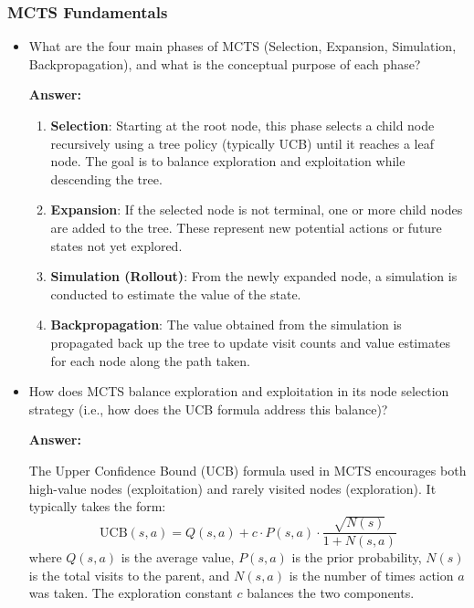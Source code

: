 \subsubsection{MCTS Fundamentals}
\begin{itemize}
    \item What are the four main phases of MCTS (Selection, Expansion, Simulation, Backpropagation), and what is the conceptual purpose of each phase?

    \textbf{Answer:}

    \begin{enumerate} 
    \item \textbf{Selection}: Starting at the root node, this phase selects a child node recursively using a tree policy (typically UCB) until it reaches a leaf node. The goal is to balance exploration and exploitation while descending the tree. 
    \item \textbf{Expansion}: If the selected node is not terminal, one or more child nodes are added to the tree. These represent new potential actions or future states not yet explored. 
    \item \textbf{Simulation (Rollout)}: From the newly expanded node, a simulation is conducted to estimate the value of the state.
    \item \textbf{Backpropagation}: The value obtained from the simulation is propagated back up the tree to update visit counts and value estimates for each node along the path taken. 
    \end{enumerate}
    
    \item How does MCTS balance exploration and exploitation in its node selection strategy (i.e., how does the UCB formula address this balance)?

    \textbf{Answer:}

    
    The Upper Confidence Bound (UCB) formula used in MCTS encourages both high-value nodes (exploitation) and rarely visited nodes (exploration). It typically takes the form:
    \[
    \text{UCB}(s, a) = Q(s, a) + c \cdot P(s, a) \cdot \frac{\sqrt{N(s)}}{1 + N(s, a)}
    \]
    where $Q(s, a)$ is the average value, $P(s, a)$ is the prior probability, $N(s)$ is the total visits to the parent, and $N(s, a)$ is the number of times action $a$ was taken. The exploration constant $c$ balances the two components.
    
\end{itemize}

